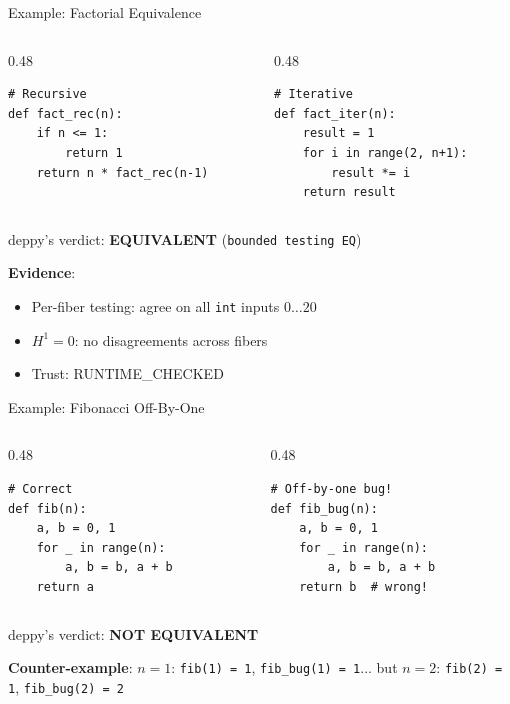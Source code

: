 \documentclass[aspectratio=169,11pt]{beamer}
\begin{document}
\begin{frame}{Example: Factorial Equivalence}
\begin{columns}
\begin{column}{0.48\textwidth}
\begin{lstlisting}[language=deppy, basicstyle=\tiny\ttfamily]
# Recursive
def fact_rec(n):
    if n <= 1:
        return 1
    return n * fact_rec(n-1)
\end{lstlisting}
\end{column}
\begin{column}{0.48\textwidth}
\begin{lstlisting}[language=deppy, basicstyle=\tiny\ttfamily]
# Iterative
def fact_iter(n):
    result = 1
    for i in range(2, n+1):
        result *= i
    return result
\end{lstlisting}
\end{column}
\end{columns}

\vspace{0.5em}
deppy's verdict: \textbf{EQUIVALENT} (\texttt{bounded testing EQ})

\vspace{0.3em}
\textbf{Evidence}:
\begin{itemize}
\item Per-fiber testing: agree on all \texttt{int} inputs $0 \ldots 20$
\item $H^1 = 0$: no disagreements across fibers
\item Trust: RUNTIME\_CHECKED
\end{itemize}
\end{frame}

\begin{frame}{Example: Fibonacci Off-By-One}
\begin{columns}
\begin{column}{0.48\textwidth}
\begin{lstlisting}[language=deppy, basicstyle=\tiny\ttfamily]
# Correct
def fib(n):
    a, b = 0, 1
    for _ in range(n):
        a, b = b, a + b
    return a
\end{lstlisting}
\end{column}
\begin{column}{0.48\textwidth}
\begin{lstlisting}[language=deppy, basicstyle=\tiny\ttfamily]
# Off-by-one bug!
def fib_bug(n):
    a, b = 0, 1
    for _ in range(n):
        a, b = b, a + b
    return b  # wrong!
\end{lstlisting}
\end{column}
\end{columns}

\vspace{0.5em}
deppy's verdict: \textbf{NOT EQUIVALENT}

\vspace{0.3em}
\textbf{Counter-example}: $n = 1$: \texttt{fib(1) = 1}, \texttt{fib\_bug(1) = 1}... but $n = 2$: \texttt{fib(2) = 1}, \texttt{fib\_bug(2) = 2} 
\end{frame}
\end{document}
